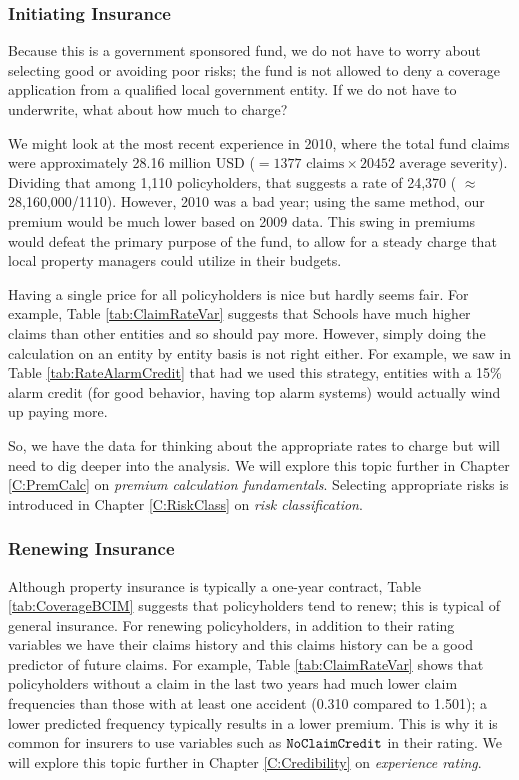\documentclass[]{book}
\theoremstyle{definition}
\theoremstyle{definition}
\theoremstyle{definition}
\theoremstyle{remark}
\begin{document}
\subsubsection*{Initiating Insurance}\label{initiating-insurance-1}

Because this is a government sponsored fund, we do not have to worry
about selecting good or avoiding poor risks; the fund is not allowed to
deny a coverage application from a qualified local government entity. If
we do not have to underwrite, what about how much to charge?

We might look at the most recent experience in 2010, where the total
fund claims were approximately 28.16 million USD
(\(=1377 \text{ claims} \times 20452 \text{ average severity}\)).
Dividing that among 1,110 policyholders, that suggests a rate of 24,370
( \(\approx\) 28,160,000/1110). However, 2010 was a bad year; using the
same method, our premium would be much lower based on 2009 data. This
swing in premiums would defeat the primary purpose of the fund, to allow
for a steady charge that local property managers could utilize in their
budgets.

Having a single price for all policyholders is nice but hardly seems
fair. For example, Table \ref{tab:ClaimRateVar} suggests that Schools
have much higher claims than other entities and so should pay more.
However, simply doing the calculation on an entity by entity basis is
not right either. For example, we saw in Table \ref{tab:RateAlarmCredit}
that had we used this strategy, entities with a 15\% alarm credit (for
good behavior, having top alarm systems) would actually wind up paying
more.

So, we have the data for thinking about the appropriate rates to charge
but will need to dig deeper into the analysis. We will explore this
topic further in Chapter \ref{C:PremCalc} on \emph{premium calculation
fundamentals}. Selecting appropriate risks is introduced in Chapter
\ref{C:RiskClass} on \emph{risk classification}.

\subsubsection*{Renewing Insurance}\label{renewing-insurance-1}

Although property insurance is typically a one-year contract, Table
\ref{tab:CoverageBCIM} suggests that policyholders tend to renew; this
is typical of general insurance. For renewing policyholders, in addition
to their rating variables we have their claims history and this claims
history can be a good predictor of future claims. For example, Table
\ref{tab:ClaimRateVar} shows that policyholders without a claim in the
last two years had much lower claim frequencies than those with at least
one accident (0.310 compared to 1.501); a lower predicted frequency
typically results in a lower premium. This is why it is common for
insurers to use variables such as \({\tt NoClaimCredit}\) in their
rating. We will explore this topic further in Chapter
\ref{C:Credibility} on \emph{experience rating}.
\end{document}
